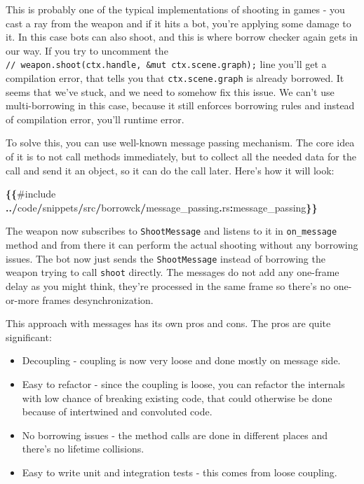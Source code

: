 \documentclass[
]{book}
\newenvironment{Shaded}{\begin{snugshade}}{\end{snugshade}}
\newcommand{\NormalTok}[1]{#1}
\newcommand{\OperatorTok}[1]{\textcolor[rgb]{0.81,0.36,0.00}{\textbf{#1}}}
\providecommand{\tightlist}{%
  \setlength{\itemsep}{0pt}\setlength{\parskip}{0pt}}
\theoremstyle{definition}
\theoremstyle{definition}
\theoremstyle{definition}
\theoremstyle{definition}
\theoremstyle{remark}
\begin{document}
This is probably one of the typical implementations of shooting in games - you cast a ray from the weapon and if it hits a bot, you're applying some damage to it. In this case bots can also shoot, and this is where borrow checker again gets in our way. If you try to uncomment the \texttt{//\ weapon.shoot(ctx.handle,\ \&mut\ ctx.scene.graph);} line you'll get a compilation error, that tells you that \texttt{ctx.scene.graph} is already borrowed. It seems that we've stuck, and we need to somehow fix this issue. We can't use multi-borrowing in this case, because it still enforces borrowing rules and instead of compilation error, you'll runtime error.

To solve this, you can use well-known message passing mechanism. The core idea of it is to not call methods immediately, but to collect all the needed data for the call and send it an object, so it can do the call later. Here's how it will look:

\begin{Shaded}
\begin{Highlighting}[]
\OperatorTok{\{\{}\NormalTok{\#include }\OperatorTok{../}\NormalTok{code}\OperatorTok{/}\NormalTok{snippets}\OperatorTok{/}\NormalTok{src}\OperatorTok{/}\NormalTok{borrowck}\OperatorTok{/}\NormalTok{message\_passing}\OperatorTok{.}\NormalTok{rs}\OperatorTok{:}\NormalTok{message\_passing}\OperatorTok{\}\}}
\end{Highlighting}
\end{Shaded}

The weapon now subscribes to \texttt{ShootMessage} and listens to it in \texttt{on\_message} method and from there it can perform the actual shooting without any borrowing issues. The bot now just sends the \texttt{ShootMessage} instead of borrowing the weapon trying to call \texttt{shoot} directly. The messages do not add any one-frame delay as you might think, they're processed in the same frame so there's no one-or-more frames desynchronization.

This approach with messages has its own pros and cons. The pros are quite significant:

\begin{itemize}
\tightlist
\item
  Decoupling - coupling is now very loose and done mostly on message side.
\item
  Easy to refactor - since the coupling is loose, you can refactor the internals with low chance of breaking existing code, that could otherwise be done because of intertwined and convoluted code.
\item
  No borrowing issues - the method calls are done in different places and there's no lifetime collisions.
\item
  Easy to write unit and integration tests - this comes from loose coupling.
\end{itemize}
\end{document}
